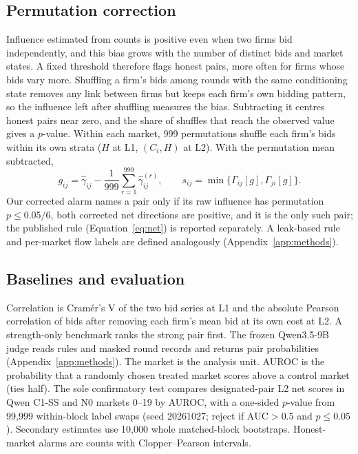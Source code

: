 \subsection{Permutation correction}
Influence estimated from counts is positive even when two firms bid
independently, and this bias grows with the number of distinct bids and
market states. A fixed threshold therefore flags honest pairs, more often
for firms whose bids vary more. Shuffling a firm's bids among rounds with
the same conditioning state removes any link between firms but keeps each
firm's own bidding pattern, so the influence left after shuffling measures
the bias. Subtracting it centres honest pairs near zero, and the share of
shuffles that reach the observed value gives a $p$-value. Within each market, 999 permutations shuffle each firm's bids within its
own strata ($H$ at L1, $(C_i,H)$ at L2). With the permutation mean
subtracted,
\begin{equation}
g_{ij}=\hat\gamma_{ij}-\frac{1}{999}\sum_{r=1}^{999}\hat\gamma^{(r)}_{ij},
\qquad s_{ij}=\min\{\Gamma_{ij}[g],\Gamma_{ji}[g]\}.
\label{eq:score}
\end{equation}
Our corrected alarm names a pair only if its raw influence has permutation
$p\le0.05/6$, both corrected net directions are positive, and it is the
only such pair; the published rule (Equation~\ref{eq:net}) is reported
separately. A leak-based rule and per-market flow labels are defined
analogously (Appendix~\ref{app:methods}).

\subsection{Baselines and evaluation}
Correlation is Cram\'er's V of the two bid series at L1 and the absolute
Pearson correlation of bids after removing each firm's mean bid at its own
cost at L2. A strength-only benchmark ranks the strong pair first. The
frozen Qwen3.5-9B judge reads rules and masked round records and returns
pair probabilities (Appendix~\ref{app:methods}). The market is the analysis
unit. AUROC is the probability that a randomly chosen treated market scores
above a control market (ties half). The sole confirmatory test compares
designated-pair L2 net scores in Qwen C1-SS and N0 markets 0--19 by AUROC,
with a one-sided $p$-value from 99,999 within-block label swaps (seed
20261027; reject if $\mathrm{AUC}>0.5$ and $p\le0.05$).
Secondary estimates use 10,000 whole matched-block bootstraps. Honest-market
alarms are counts with Clopper--Pearson intervals.

